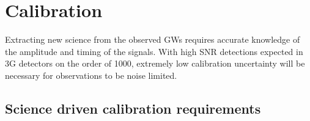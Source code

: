 \chapter{Calibration}
\label{sec:Calibration}

Extracting new science from the observed GWs requires accurate knowledge of the amplitude and timing of the signals. With high SNR detections expected in 3G detectors on the order of 1000, extremely low calibration uncertainty will be necessary for observations to be noise limited.

\section{Science driven calibration requirements}


